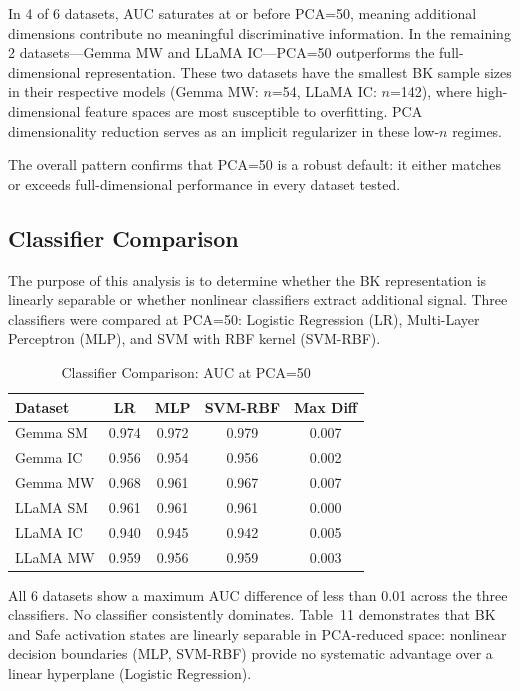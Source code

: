 \documentclass[11pt,a4paper]{article}
\begin{document}
In 4 of 6 datasets, AUC saturates at or before PCA=50, meaning additional dimensions contribute no meaningful discriminative information. In the remaining 2 datasets---Gemma MW and LLaMA IC---PCA=50 outperforms the full-dimensional representation. These two datasets have the smallest BK sample sizes in their respective models (Gemma MW: $n$=54, LLaMA IC: $n$=142), where high-dimensional feature spaces are most susceptible to overfitting. PCA dimensionality reduction serves as an implicit regularizer in these low-$n$ regimes.

The overall pattern confirms that PCA=50 is a robust default: it either matches or exceeds full-dimensional performance in every dataset tested.

\subsection{Classifier Comparison}

The purpose of this analysis is to determine whether the BK representation is linearly separable or whether nonlinear classifiers extract additional signal. Three classifiers were compared at PCA=50: Logistic Regression (LR), Multi-Layer Perceptron (MLP), and SVM with RBF kernel (SVM-RBF).

\begin{table}[H]
\centering
\caption{Classifier Comparison: AUC at PCA=50}
\begin{tabular}{lcccc}
\toprule
\textbf{Dataset} & \textbf{LR} & \textbf{MLP} & \textbf{SVM-RBF} & \textbf{Max Diff} \\
\midrule
Gemma SM & 0.974 & 0.972 & 0.979 & 0.007 \\
Gemma IC & 0.956 & 0.954 & 0.956 & 0.002 \\
Gemma MW & 0.968 & 0.961 & 0.967 & 0.007 \\
LLaMA SM & 0.961 & 0.961 & 0.961 & 0.000 \\
LLaMA IC & 0.940 & 0.945 & 0.942 & 0.005 \\
LLaMA MW & 0.959 & 0.956 & 0.959 & 0.003 \\
\bottomrule
\end{tabular}
\end{table}

All 6 datasets show a maximum AUC difference of less than 0.01 across the three classifiers. No classifier consistently dominates. Table~11 demonstrates that BK and Safe activation states are linearly separable in PCA-reduced space: nonlinear decision boundaries (MLP, SVM-RBF) provide no systematic advantage over a linear hyperplane (Logistic Regression).
\end{document}
